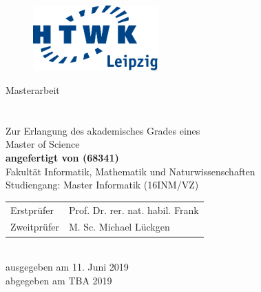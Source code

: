 \makeatletter
\begin{titlepage}
  \vspace{1cm}

  \begin{figure}[h!]
    \centering
    \includegraphics[height=2.5cm]{src/Title/logo_htwk.pdf}
  \end{figure}

  \begin{center}
    \vspace{1cm}

    \begin{onehalfspacing}
      {\Large Masterarbeit} \\[8ex]
      \textbf{
        {\Huge \@title} \\[5ex]
        {\Large \@subtitle} \\[8ex]
      }
      \large
      Zur Erlangung des akademisches Grades eines \\
      Master of Science \\[5ex]
      \vfill
      \textbf{angefertigt von \@author{ }(68341)}\\[5ex]
      \vfill
      Fakultät Informatik, Mathematik und Naturwissenschaften\\
      Studiengang: Master Informatik (16INM/VZ)\\[5ex]
      \vfill
      \begin{tabular}{ll}
          Erstprüfer & Prof. Dr. rer. nat. habil. Frank\\
          Zweitprüfer & M. Sc. Michael Lückgen
      \end{tabular} \\[5ex]
      \vfill
      ausgegeben am 11. Juni 2019 \\
      abgegeben am TBA 2019
    \end{onehalfspacing}
  \end{center}
\end{titlepage}
\makeatother
